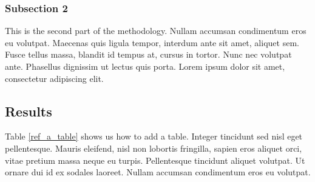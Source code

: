 \hypertarget{subsection-2-2}{%
\subsubsection{Subsection 2}\label{subsection-2-2}}

This is the second part of the methodology. Nullam accumsan
condimentum eros eu volutpat. Maecenas quis ligula tempor, interdum
ante sit amet, aliquet sem. Fusce tellus massa, blandit id tempus
at, cursus in tortor. Nunc nec volutpat ante. Phasellus dignissim ut
lectus quis porta. Lorem ipsum dolor sit amet, consectetur
adipiscing elit.

\hypertarget{results-2}{%
\subsection{Results}\label{results-2}}

Table \ref{ref_a_table} shows us how to add a table. Integer
tincidunt sed nisl eget pellentesque. Mauris eleifend, nisl non
lobortis fringilla, sapien eros aliquet orci, vitae pretium massa
neque eu turpis. Pellentesque tincidunt aliquet volutpat. Ut ornare
dui id ex sodales laoreet. Nullam accumsan condimentum eros eu
volutpat.

